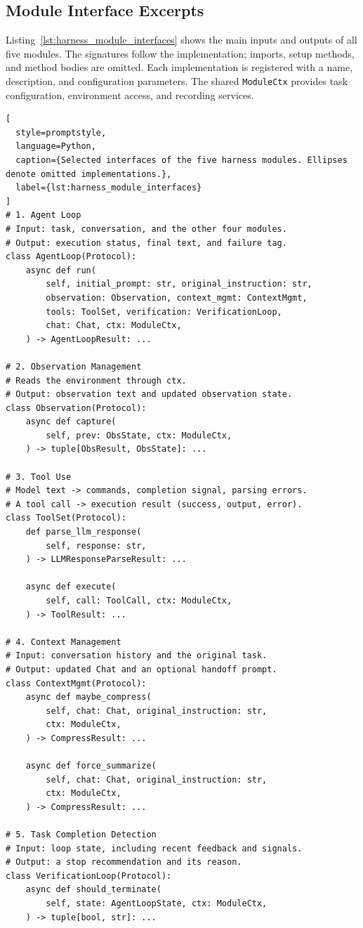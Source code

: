 \documentclass{article} %
\begin{document}
\subsection{Module Interface Excerpts}

Listing~\ref{lst:harness_module_interfaces} shows the main inputs and outputs of all five modules. The signatures follow the implementation; imports, setup methods, and method bodies are omitted. Each implementation is registered with a name, description, and configuration parameters. The shared \texttt{ModuleCtx} provides task configuration, environment access, and recording services.

\begin{lstlisting}[
  style=promptstyle,
  language=Python,
  caption={Selected interfaces of the five harness modules. Ellipses denote omitted implementations.},
  label={lst:harness_module_interfaces}
]
# 1. Agent Loop
# Input: task, conversation, and the other four modules.
# Output: execution status, final text, and failure tag.
class AgentLoop(Protocol):
    async def run(
        self, initial_prompt: str, original_instruction: str,
        observation: Observation, context_mgmt: ContextMgmt,
        tools: ToolSet, verification: VerificationLoop,
        chat: Chat, ctx: ModuleCtx,
    ) -> AgentLoopResult: ...

# 2. Observation Management
# Reads the environment through ctx.
# Output: observation text and updated observation state.
class Observation(Protocol):
    async def capture(
        self, prev: ObsState, ctx: ModuleCtx,
    ) -> tuple[ObsResult, ObsState]: ...

# 3. Tool Use
# Model text -> commands, completion signal, parsing errors.
# A tool call -> execution result (success, output, error).
class ToolSet(Protocol):
    def parse_llm_response(
        self, response: str,
    ) -> LLMResponseParseResult: ...

    async def execute(
        self, call: ToolCall, ctx: ModuleCtx,
    ) -> ToolResult: ...

# 4. Context Management
# Input: conversation history and the original task.
# Output: updated Chat and an optional handoff prompt.
class ContextMgmt(Protocol):
    async def maybe_compress(
        self, chat: Chat, original_instruction: str,
        ctx: ModuleCtx,
    ) -> CompressResult: ...

    async def force_summarize(
        self, chat: Chat, original_instruction: str,
        ctx: ModuleCtx,
    ) -> CompressResult: ...

# 5. Task Completion Detection
# Input: loop state, including recent feedback and signals.
# Output: a stop recommendation and its reason.
class VerificationLoop(Protocol):
    async def should_terminate(
        self, state: AgentLoopState, ctx: ModuleCtx,
    ) -> tuple[bool, str]: ...
\end{lstlisting}
\end{document}
